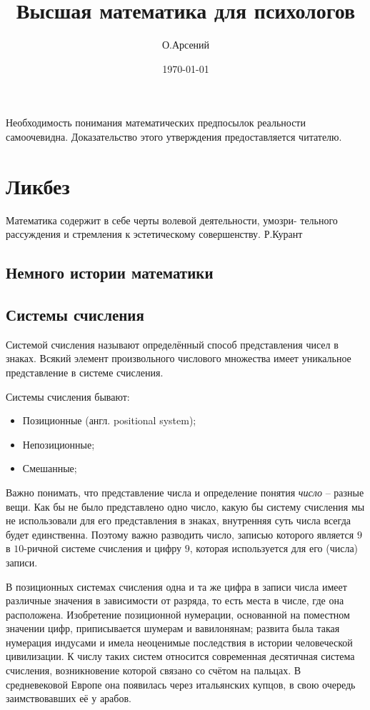 \documentclass[a4paper]{book}
\author{О.Арсений}
\title{Высшая математика для психологов}
\date{\today}
\begin{document}
 
	
	\maketitle
	Необходимость понимания математических предпосылок реальности самоочевидна. Доказательство этого утверждения предоставляется читателю. 
	
\chapter{Ликбез}

\begin{flushright}
	Математика содержит в себе черты волевой деятельности, умозри-
	тельного рассуждения и стремления к эстетическому совершенству. Р.Курант
\end{flushright}

\section{Немного истории математики}



\section{Системы счисления}
Системой счисления называют определённый способ представления чисел в знаках. Всякий элемент произвольного числового множества имеет уникальное представление в системе счисления. 

Системы счисления бывают: 
\begin{itemize}
	\item Позиционные (англ. positional system);
	\item Непозиционные; 
	\item Смешанные; 
\end{itemize}

Важно понимать, что представление числа и определение понятия \textit{число} -- разные вещи. Как бы не было представлено одно число, какую бы систему счисления мы не использовали для его представления в знаках, внутренняя суть числа всегда будет единственна. Поэтому важно разводить число, записью которого является $9$ в $10$-ричной системе счисления и цифру $9$, которая используется для его (числа) записи. 

В позиционных системах счисления одна и та же цифра в записи числа имеет различные значения в зависимости от разряда, то есть места в числе, где она расположена. Изобретение позиционной нумерации, основанной на поместном значении цифр, приписывается шумерам и вавилонянам; развита была такая нумерация индусами и имела неоценимые последствия в истории человеческой цивилизации. К числу таких систем относится современная десятичная система счисления, возникновение которой связано со счётом на пальцах. В средневековой Европе она появилась через итальянских купцов, в свою очередь заимствовавших её у арабов.
\end{document}
